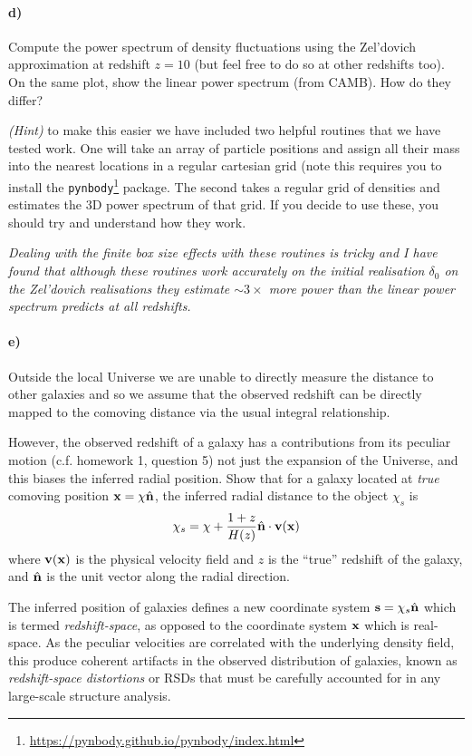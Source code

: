 \documentclass[12pt]{article}
\begin{document}
\paragraph{d)} Compute the power spectrum of density fluctuations using the
Zel'dovich approximation at redshift $z=10$ (but feel free to do so at other
redshifts too). On the same plot, show the linear power spectrum (from CAMB).
How do they differ?

\emph{(Hint)} to make this easier we have included two helpful routines that we have tested work. One will take an array of particle positions and assign all their mass into the nearest locations in a regular cartesian grid (note this requires you to install the \texttt{pynbody}\footnote{\url{https://pynbody.github.io/pynbody/index.html}} package. The second takes a regular grid of densities and estimates the 3D power spectrum of that grid. If you decide to use these, you should try and understand how they work.

\emph{Dealing with the finite box size effects with these routines is tricky and I have found that although these routines work accurately on the initial realisation $\delta_0$ on the Zel'dovich realisations they estimate $\sim 3 \times$ more power than the linear power spectrum predicts at all redshifts.}

\paragraph{e)} Outside the local Universe we are unable to directly measure the distance to other galaxies and so we assume that the observed redshift can be directly mapped to the comoving distance via the usual integral relationship.

However, the observed redshift of a galaxy has a contributions from its peculiar motion (c.f. homework 1, question 5) not just the expansion of the Universe, and this biases the inferred radial position. Show that for a galaxy located at \emph{true} comoving position ${\boldsymbol{\mathbf{x}}} = \chi \hat{{\boldsymbol{\mathbf{n}}}}$, the inferred radial distance to the object $\chi_s$ is
\begin{equation}
    \chi_s = \chi + \frac{1 + z}{H(z)}\hat{{\boldsymbol{\mathbf{n}}}} \cdot {\boldsymbol{\mathbf{v}}}({\boldsymbol{\mathbf{x}}})
\end{equation}
where ${\boldsymbol{\mathbf{v}}}({\boldsymbol{\mathbf{x}}})$ is the physical velocity field and $z$ is the ``true'' redshift of the galaxy, and $\hat{{\boldsymbol{\mathbf{n}}}}$ is the unit vector along the radial direction.

The inferred position of galaxies defines a new coordinate system ${\boldsymbol{\mathbf{s}}} = \chi_s \hat{{\boldsymbol{\mathbf{n}}}}$ which is termed \emph{redshift-space}, as opposed to the coordinate system ${\boldsymbol{\mathbf{x}}}$ which is real-space. As the peculiar velocities are correlated with the underlying density field, this produce coherent artifacts in the observed distribution of galaxies, known as \emph{redshift-space distortions} or RSDs that must be carefully accounted for in any large-scale structure analysis.
\end{document}
